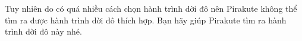 \begin{itemize}
\end{itemize}

Tuy nhiên do có quá nhiều cách chọn hành trình dời đô nên Pirakute không thể tìm ra được hành trình dời đô thích hợp. Bạn hãy giúp Pirakute tìm ra hành trình dời đô này nhé.